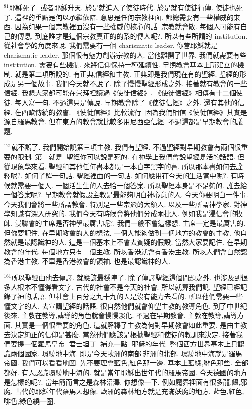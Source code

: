 \documentclass{book}
\begin{document}
$^{81}$耶穌死了.
或者耶穌升天.
於是就進入了使徒時代.
於是就有使徒行傳.
使徒也死了.
這裡的重點是何以承繼依陪.
意思是任何宗教裡面.
都總需要有一些權威的東西.
因為如果一個宗教裡面沒有一些權威的核心的話.
宗教就會散.
每個人可能有自己的傳息.
到底誰才是這個宗教真正的的系的傳人呢?.
所以有些所謂的 institution.
從社會學的角度來說.
我們需要有一個 charismatic leader.
你當耶穌就是 charismatic leader.
那個很有魅力創辦宗教的人.
當他離開了世界.
我們就需要有些 institution.
需要有些機制.
來將信仰保持一種延續性.
早期教會基本上所建立的機制.
就是第二項所說的.
有正典,信經和主教.
正典即是我們現在有的聖經.
聖經的形成是另一個故事.
我們今天就不說了.
除了慢慢聖經形成之外.
接著就有教會的一些信經.
我想大家都可能在崇拜裡讀過《使徒信經》.
《使徒信經》相傳有十二個使徒.
每人寫一句.
不過這只是傳說.
早期教會除了《使徒信經》之外.
還有其他的信經.
在西歐傳統的教會.
《使徒信經》比較流行.
因為我們相信《使徒信經》其實是源自羅馬教會.
但在東方的教會就比較多用尼西亞信經.
不過這都是早期教會的議題.

$^{121}$就不說了.
我們開始說第三項主教.
我們有聖經.
不過聖經對早期教會有兩個很重要的限制.
第一就是.
聖經你可以說是死的.
在神學上我們會說聖經是活的話語.
但從現象學來看.
聖經和其他任何書本都是一本白字黑字的書.
所以那本書如何去詮釋呢?.
如何了解一句話.
聖經裡面的一句話.
如何應用在今天的生活當中呢?.
有時候就需要一個人.
一個活生生的人去給一個答案.
所以聖經本身是不足夠的.
誰去給一個答案呢?.
早期教會就假設主教是最能夠明白神心意的人.
今天你要明白一件事.
今天我們會將一些所謂教會.
特別是一些宗派的大領人.
以及一些所謂神學家.
對神學知識有深入研究的.
我們今天有時候會將他們分成兩批人.
例如我是浸信會的牧師.
浸聯會的主席是否神學最厲害呢?.
我們一般不會這樣想.
主席一定是最厲害的.
但你要記住.
在早期教會的人的想法.
一個人能夠做到一個地方的教會的主教.
他自然就是最認識神的人.
這是一個基本上不會去質疑的假設.
當然大家要記住.
在早期教會的年代.
每個地方只有一個主教.
所以香港就會有香港主教.
所以人們會自然認為香港主教.
不單是香港教會的領袖.
也是最認識神的人.

$^{161}$所以聖經由他去傳譯.
就應該最穩陣了.
除了傳譯聖經這個問題之外.
也涉及到很多人根本不懂得看文字.
古代的社會不是今天的社會.
所以就算我們說.
聖經已經記錄了神的話語.
但社會上百分之九十九的人是沒有能力去看的.
所以他們需要一些懂文字的人.
去宣講聖經的話語.
很自然他們就會仰望主教的教導角色.
到了中世紀後來.
主教在教導,講導的角色就會慢慢淡化.
不過在早期教會.
主教在教導,講導方面.
其實是一個很重要的角色.
這就解釋了主教為何對早期教會如此重要.
是由主教去決定純正的信仰是甚麼.
當然他們應該是根據聖經和使徒的教訓來決定.
接著我們要提一個羅馬皇帝.
君士坦丁.
補充一點.
耶穌的年代.
整個西方世界基本上只認識兩個國家.
環繞地中海.
即是今天歐洲的南部,非洲的北部.
環繞地中海就是羅馬帝國.
我們可以看看地圖.
先不要理會藍色,紅色那一邊.
基本上藍綠,啡色那些.
全部都好.
有人認識環繞地中海的.
就是當年耶穌出世年代的羅馬帝國.
今天德國的地方是怎樣的呢?.
當年簡而言之是森林沼澤.
你想像一下.
例如魔界裡面有很多龍,鱷,邪魔.
古代的耶穌年代羅馬人想像.
歐洲的森林地方就是充滿妖魔的地方.
藍色,紅色,啡色,綠色繞一圈.
\end{document}
